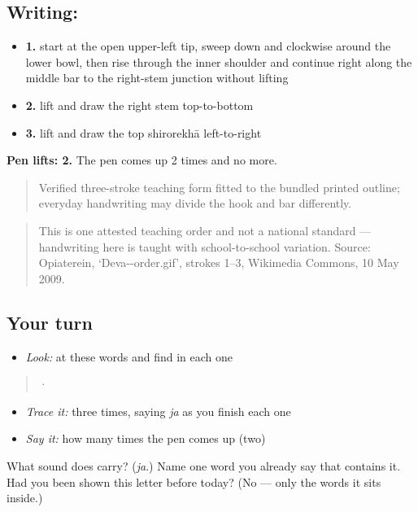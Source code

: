 \subsection*{Writing: }

\begin{itemize}
\raggedright
  \item \textbf{1.} start at the open upper-left tip, sweep down and clockwise around the lower bowl, then rise through the inner shoulder and continue right along the middle bar to the right-stem junction without lifting
  \item \textbf{2.} lift and draw the right stem top-to-bottom
  \item \textbf{3.} lift and draw the top shirorekhā left-to-right
\end{itemize}

\textbf{Pen lifts: 2.} The pen comes up 2 times and no more.

\begin{quote}
Verified three-stroke teaching form fitted to the bundled printed outline; everyday handwriting may divide the hook and bar differently.
\end{quote}

\begin{quote}
This is one attested teaching order and not a national standard — handwriting here is taught with school-to-school variation. Source: Opiaterein, ‘Deva--order.gif’, strokes 1–3, Wikimedia Commons, 10 May 2009.
\end{quote}

\subsection*{Your turn}
\begin{itemize}
\raggedright
  \item \emph{Look:} at these words and find  in each one
\end{itemize}

\begin{quote}
  ·  
\end{quote}

\begin{itemize}
\raggedright
  \item \emph{Trace it:}  three times, saying \emph{ja} as you finish each one
  \item \emph{Say it:} how many times the pen comes up (two)
\end{itemize}

\begin{tcolorbox}[breakable,colback=teal!4,colframe=teal!35!black,title={Before you move on}]
What sound does \textbf{} carry? (\emph{ja}.) Name one word you already say that contains it. Had you been shown this letter before today? (No — only the words it sits inside.)
\end{tcolorbox}
